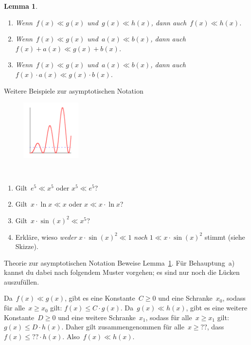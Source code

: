 \documentclass[twoside]{../zirkelblatt1415}
\theoremstyle{definition}
\theoremstyle{plain}
\newtheorem{lemma}[defn]{Lemma}
\theoremstyle{remark}
\begin{document}
\begin{lemma}\label{lemma:asympt}\begin{enumerate}
\item Wenn~$f(x) \ll g(x)$ und~$g(x) \ll h(x)$, dann auch~$f(x) \ll h(x)$.
\item Wenn~$f(x) \ll g(x)$ und~$a(x) \ll b(x)$, dann auch~$f(x)+a(x) \ll
g(x)+b(x)$.
\item Wenn~$f(x) \ll g(x)$ und~$a(x) \ll b(x)$, dann auch~$f(x) \cdot a(x) \ll
g(x) \cdot b(x)$.
\end{enumerate}
\end{lemma}

\begin{aufgabe}{Weitere Beispiele zur asymptotischen Notation}
\begin{figure}
\includegraphics[width=3cm]{asymptotic-notation}
\end{figure}
\ \\
\vspace{-3em}
\begin{enumerate}
\item Gilt~$e^5 \ll x^5$ oder $x^5 \ll e^5$?
\item Gilt~$x \cdot \ln x \ll x$ oder $x \ll x \cdot \ln x$?
\item Gilt~$x \cdot \sin(x)^2 \ll x^5$?
\item Erkläre, wieso \emph{weder} $x \cdot \sin(x)^2 \ll 1$ \emph{noch} $1 \ll x
\cdot \sin(x)^2$ stimmt (siehe Skizze).
\end{enumerate}\fixlistspacing
\end{aufgabe}

\begin{aufgabe}{Theorie zur asymptotischen Notation}
Beweise Lemma~\ref{lemma:asympt}. Für Behauptung~a) kannst du dabei nach
folgendem Muster vorgehen; es sind nur noch die Lücken auszufüllen.

Da~$f(x) \ll g(x)$, gibt es eine Konstante~$C \geq 0$ und eine Schranke~$x_0$,
sodass für alle~$x \geq x_0$ gilt: $f(x) \leq C \cdot g(x)$. Da~$g(x) \ll
h(x)$, gibt es eine weitere Konstante~$D \geq 0$ und eine weitere
Schranke~$x_1$, sodass für alle~$x \geq x_1$ gilt: $g(x) \leq D \cdot h(x)$.
Daher gilt zusammengenommen für alle~$x \geq {??}$, dass~$f(x) \leq {??} \cdot
h(x)$. Also~$f(x) \ll h(x)$.
\end{aufgabe}
\end{document}
